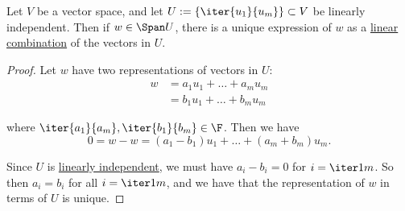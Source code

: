 \label{dcafe9d}

Let $V$ be a vector space, and let $U:=\{\iter{u_1}{u_m}\}\subset V$ be
linearly independent. Then if $w\in\Span U$, there is a unique expression of
$w$ as a \href{ceb6342}{linear combination} of the vectors in $U$.

\begin{proof}
  Let $w$ have two representations of vectors in $U$:
  \begin{align*}
    w &=a_1u_1+\ldots+a_mu_m \\
      &=b_1u_1+\ldots+b_mu_m
  \end{align*}

  where $\iter{a_1}{a_m},\iter{b_1}{b_m}\in\F$. Then we have
  $$
    0=w-w=(a_1-b_1)u_1+\ldots+(a_m+b_m)u_m.
  $$

  Since $U$ is \href{c133a44}{linearly independent}, we must have $a_i-b_i=0$
  for $i=\iter1m$. So then $a_i=b_i$ for all $i=\iter1m$, and we have that the
  representation of $w$ in terms of $U$ is unique.
\end{proof}
